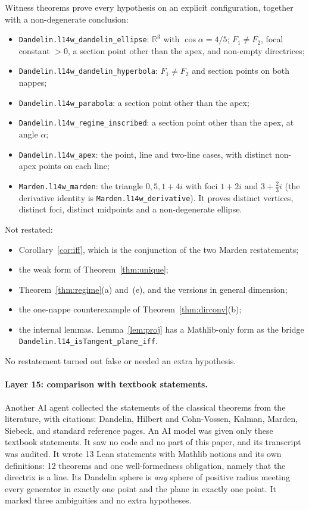 \documentclass[11pt]{article}
\theoremstyle{remark}
\newcommand{\lean}[1]{\texttt{#1}}
\newcommand{\R}{\mathbb{R}}
\begin{document}
Witness theorems prove every hypothesis on an explicit configuration, together with a
non-degenerate conclusion:
\begin{itemize}
\item \lean{Dandelin.l14w\_dandelin\_ellipse}: $\R^3$ with $\cos\alpha=4/5$; $F_1\ne F_2$, focal
constant $>0$, a section point other than the apex, and non-empty directrices;
\item \lean{Dandelin.l14w\_dandelin\_hyperbola}: $F_1\ne F_2$ and section points on both nappes;
\item \lean{Dandelin.l14w\_parabola}: a section point other than the apex;
\item \lean{Dandelin.l14w\_regime\_inscribed}: a section point other than the apex, at angle
$\alpha$;
\item \lean{Dandelin.l14w\_apex}: the point, line and two-line cases, with distinct non-apex
points on each line;
\item \lean{Marden.l14w\_marden}: the triangle $0,5,1+4i$ with foci $1+2i$ and $3+\frac23i$
(the derivative identity is \lean{Marden.l14w\_derivative}). It proves distinct vertices,
distinct foci, distinct midpoints and a non-degenerate ellipse.
\end{itemize}
Not restated:
\begin{itemize}
\item Corollary~\ref{cor:iff}, which is the conjunction of the two Marden restatements;
\item the weak form of Theorem~\ref{thm:unique};
\item Theorem~\ref{thm:regime}(a) and~(e), and the versions in general dimension;
\item the one-nappe counterexample of Theorem~\ref{thm:dirconv}(b);
\item the internal lemmas. Lemma~\ref{lem:proj} has a Mathlib-only form as the bridge
\lean{Dandelin.l14\_isTangent\_plane\_iff}.
\end{itemize}
No restatement turned out false or needed an extra hypothesis.

\paragraph{Layer 15: comparison with textbook statements.} Another AI agent collected the
statements of the classical theorems from the literature, with citations: Dandelin, Hilbert and
Cohn-Vossen, Kalman, Marden, Siebeck, and standard reference pages. An AI model was given only
these textbook statements. It saw no code and no part of this paper, and its transcript was
audited. It wrote 13 Lean statements with Mathlib notions and its own definitions: 12 theorems and
one well-formedness obligation, namely that the directrix is a line. Its Dandelin sphere is
\emph{any} sphere of positive radius meeting every generator in exactly one point and the plane
in exactly one point. It marked three ambiguities and no extra hypotheses.
\end{document}
